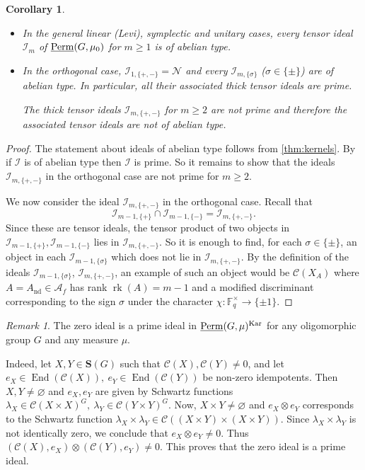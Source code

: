 \documentclass[11pt,a4paper]{amsart}
\theoremstyle{plain}%
\newtheorem{corollary}[lemma]{Corollary}
\theoremstyle{definition}
\theoremstyle{remark}
\newtheorem{remark}[lemma]{Remark}
\newcommand{\rk}{{\operatorname{rk}}}
\newcommand{\End}{\operatorname{End}}
\newcommand{\Perm}{\underline{{\rm Perm}}}
\newcommand{\F}{{\mathbb F}}
\newcommand{\Kar}{\mathrm{Kar}}
\newcommand{\I}{\mathcal{I}}
\newcommand{\N}{\mathcal N}
\newcommand{\nd}{\mathrm{nd}}
\newcommand{\cC}{\mathcal{C}}
\newcommand{\Set}[1]{\mathbf{S}(#1)}
\begin{document}
\begin{corollary}\label{cor:abelian-nonzero}

\mbox{}

\begin{itemize}[itemindent=0pt,leftmargin=*]
    \item In the general linear (Levi), symplectic and unitary cases, every tensor ideal $\mathcal I_m$ of $\Perm(G, \mu_0)$ for $m\geq1$ is of abelian type.  
    \item In the orthogonal case, $\mathcal I_{1,\{+,-\}}=\N$ and every $\mathcal I_{m,\{\sigma\}}$ ($\sigma\in \{\pm\}$) are of abelian type. In particular, all their associated thick tensor ideals are prime. 

The thick tensor ideals $\mathcal{I}_{m,\{+,-\}}$ for $m\geq 2$ are not prime and therefore the associated tensor ideals are not of abelian type. 
\end{itemize}

\end{corollary}

\begin{proof} The statement about ideals of abelian type follows from \cref{thm:kernels}. By \cite{CEO-abelian} if $\mathcal I$ is of abelian type then $\mathcal{I}$ is prime. So it remains to show that the ideals $\mathcal I_{m,\{+,-\}}$ in the orthogonal case are not prime for $m \geq 2$.



We now consider the ideal $\mathcal{I}_{m,\{+,-\}}$ in the orthogonal case. Recall that $$\I_{m-1,\{+\}} \cap \I_{m-1,\{-\}} = \I_{m,\{+,-\}}.$$ Since these are tensor ideals, the tensor product of two objects in $\I_{m-1,\{+\}}, \I_{m-1,\{-\}}$ lies in $\I_{m,\{+,-\}}$. So it is enough to find, for each $\sigma\in \{\pm\}$, an object in each $\I_{m-1,\{\sigma\}}$ which does not lie in $\I_{m,\{+,-\}}$. By the definition of the ideals $\I_{m-1,\{\sigma\}}$, $\I_{m,\{+,-\}}$, an example of such an object would be $\cC(X_A)$ where $A=A_{\nd}\in \mathcal{A}_f$ has rank $\rk(A)=m-1$ and a modified discriminant corresponding to the sign $\sigma$ under the character $\chi:\F_q^\times \to \{\pm 1\}$.


\end{proof}

\begin{remark}
    The zero ideal is a prime ideal in $\Perm(G, \mu)^{\Kar}$ for any oligomorphic group $G$ and any measure $\mu$. 
    
    Indeed, let $X,Y\in \Set{G}$ such that $ \cC(X),\cC(Y) \neq 0$, and let $e_X\in \End(\cC(X)), ~e_Y\in \End(\cC(Y))$ be non-zero idempotents. Then $X,Y\neq \varnothing$ and $e_X, e_Y$ are given by Schwartz functions $\lambda_X\in \cC(X\times X)^G,~ \lambda_Y\in \cC(Y\times Y)^G$. Now, $X\times Y\neq \varnothing$ and $e_X\otimes e_Y$ corresponds to the Schwartz function $\lambda_X\times \lambda_Y \in \cC({(X\times Y)\times(X\times Y)})$. Since $\lambda_X\times \lambda_Y$ is not identically zero, we conclude that $e_X\otimes e_Y\neq 0$. Thus $(\cC(X), e_X)\otimes (\cC(Y), e_Y)\neq 0$. This proves that the zero ideal is a prime ideal.
\end{remark}
\end{document}
